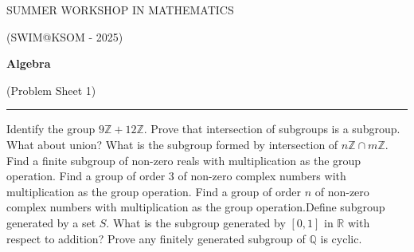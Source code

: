 \documentclass[fleqn]{exam}
\begin{document}
\begin{center}
	{\huge SUMMER WORKSHOP IN MATHEMATICS}
	
	\bigskip
	
	{\large (SWIM@KSOM - 2025)}
	
	\bigskip


	\textbf{\Large Algebra}
	
	\medskip

	{\large (Problem Sheet 1)}

	\medskip
	
	\hrule
\end{center}

\begin{questions}
	\question Identify the group $9\mathbb{Z}+12\mathbb{Z}$.
	\question Prove that intersection of subgroups is a subgroup. What about union?
	\question What is the subgroup formed by intersection of $n\mathbb{Z}\cap m\mathbb{Z}$.
	\question Find a finite subgroup of non-zero reals with multiplication as the group operation.
	\question Find a group of order 3 of non-zero complex numbers with multiplication as the group operation.
	\question Find a group of order $n$ of non-zero complex numbers with multiplication as the group operation.\question Define subgroup generated by a set $S$. What is the subgroup generated by $[0, 1]$ in $\mathbb{R}$ with respect to addition?
	\question Prove any finitely generated subgroup of $\mathbb{Q}$ is cyclic.
\end{questions}
\end{document}
